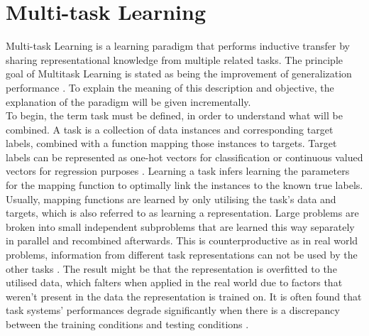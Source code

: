 

\section{Multi-task Learning}

Multi-task Learning is a learning paradigm that performs inductive transfer by sharing representational knowledge from multiple related tasks. The principle goal of Multitask Learning is stated as being the improvement of generalization performance \citep{caruana1997multitask}. To explain the meaning of this description and objective, the explanation of the paradigm will be given incrementally.\\

To begin, the term task must be defined, in order to understand what will be combined. A task is a collection of data instances and corresponding target labels, combined with a function mapping those instances to targets. Target labels can be represented as one-hot vectors for classification or continuous valued vectors for regression purposes \citep{meyer2019multi}. Learning a task infers learning the parameters for the mapping function to optimally link the instances to the known true labels. Usually, mapping functions are learned by only utilising the task's data and targets, which is also referred to as learning a representation. Large problems are broken into small independent subproblems that are learned this way separately in parallel and recombined afterwards. This is counterproductive as in real world problems, information from different task representations can not be used by the other tasks \citep{caruana1997multitask}. The result might be that the representation is overfitted to the utilised data, which falters when applied in the real world due to factors that weren't present in the data the representation is trained on. It is often found that task systems' performances degrade significantly when there is a discrepancy between the training conditions and testing conditions \cite{lu2004multitask}. \\

